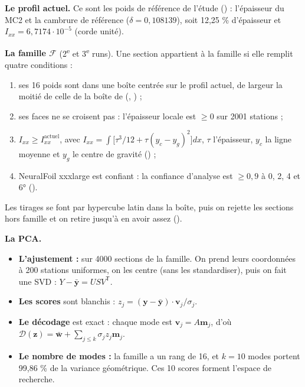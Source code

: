 \documentclass[10pt,a4paper]{article}
\newcommand{\vz}{\bm{z}}
\newcommand{\vw}{\bm{w}}
\newcommand{\tp}{^{\mathsf{T}}}
\begin{document}
\textbf{Le profil actuel.} Ce sont les poids de référence de l'étude 
() : l'épaisseur du MC2 et la cambrure de
référence ($\delta=0{,}108139$), soit 12,25 \% d'épaisseur et $I_{xx}=6{,}7174\cdot10^{-5}$ (corde unité).

\textbf{La famille $\mathcal{F}$} (2\textsuperscript{e} et 3\textsuperscript{e} runs). Une section appartient
à la famille si elle remplit quatre conditions :
\begin{enumerate}
  \item ses 16 poids sont dans une boîte centrée sur le profil actuel, de largeur la moitié de celle de la
        boîte de  (, ) ;
  \item ses faces ne se croisent pas : l'épaisseur locale est $\ge0$ sur 2001 stations ;
  \item $I_{xx}\ge I_{xx}^{\text{actuel}}$, avec
        $I_{xx}=\int\big[\tau^3/12+\tau(y_c-y_g)^2\big]dx$, $\tau$ l'épaisseur, $y_c$ la ligne moyenne et $y_g$
        le centre de gravité () ;
  \item NeuralFoil xxxlarge est confiant : la confiance d'analyse est $\ge0{,}9$ à 0, 2, 4 et 6° ().
\end{enumerate}
Les tirages se font par hypercube latin dans la boîte, puis on rejette les sections hors famille et on retire
jusqu'à en avoir assez ().

\textbf{La PCA.}
\begin{itemize}
  \item \textbf{L'ajustement :} sur 4000 sections de la famille. On prend leurs coordonnées à 200 stations
        uniformes, on les centre (sans les standardiser), puis on fait une SVD :
        $Y-\bar{\bm{y}}=USV\tp$.
  \item \textbf{Les scores} sont blanchis : $z_j=(\bm{y}-\bar{\bm{y}})\cdot\bm{v}_j/\sigma_j$.
  \item \textbf{Le décodage} est exact : chaque mode est $\bm{v}_j=A\bm{m}_j$, d'où
        $\mathcal{D}(\vz)=\bar{\vw}+\sum_{j\le k}\sigma_j z_j\bm{m}_j$.
  \item \textbf{Le nombre de modes :} la famille a un rang de 16, et $k=10$ modes portent 99,86 \% de la
        variance géométrique. Ces 10 scores forment l'espace de recherche.
\end{itemize}
\end{document}
